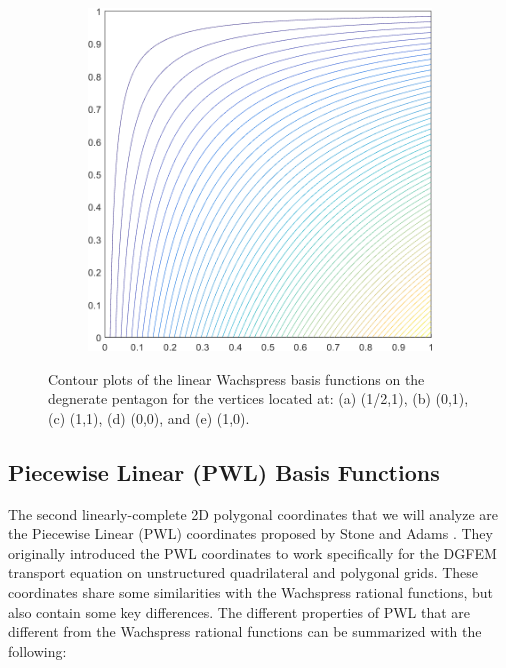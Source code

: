 \begin{figure}
\begin{subfigure}[b]{0.39\textwidth}
		\caption{}
	\end{subfigure}
	\hspace{1.5cm}
	\begin{subfigure}[b]{0.39\textwidth}
		\centering
		\includegraphics[width=\textwidth]{figures/sec_BF/deg_square_WACHSPRESS1_contour_b2.png}
		\caption{}
	\end{subfigure}
\caption{Contour plots of the linear Wachspress basis functions on the degnerate pentagon for the vertices located at: (a) (1/2,1), (b) (0,1), (c) (1,1), (d) (0,0), and (e) (1,0).}
\end{figure}

\subsection{Piecewise Linear (PWL) Basis Functions}
\label{sec::BF_2DLinear_PWL}

The second linearly-complete 2D polygonal coordinates that we will analyze are the Piecewise Linear (PWL) coordinates proposed by Stone and Adams \cite{ref::PWLD_stone_adams,ref::PWLD_stone_adams_unstructured}. They originally introduced the PWL coordinates to work specifically for the DGFEM transport equation on unstructured quadrilateral and polygonal grids. These coordinates share some similarities with the Wachspress rational functions, but also contain some key differences. The different properties of PWL that are different from the Wachspress rational functions can be summarized with the following:

